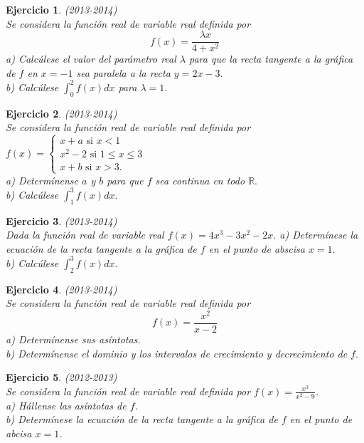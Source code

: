 \documentclass[12pt, a4paper]{amsart}
\newtheorem{ejer}{Ejercicio}
\begin{document}
\begin{ejer}\em (2013-2014)\\
Se considera la función real de variable real definida por
\[f(x)=\frac{\lambda x}{4+x^2}\]
a) Calcúlese el valor del parámetro real $\lambda$ para que la recta tangente a la gráfica de $f$ en $x=-1$ sea paralela a la recta $y=2x-3.$\\
b) Calcúlese $\int_0^2f(x)dx$ para $\lambda=1.$
\end{ejer}

\begin{ejer}\em  (2013-2014)\\
Se considera la función real de variable real definida por $f(x)=\left \{ \begin{matrix}
x+a \text{ si } x<1\\
x^2-2\text{ si } 1\leq x\leq 3\\
x+b \text{ si } x>3.
\end{matrix}\right.
$\\
a) Determínense $a$ y $b$ para que $f$ sea continua en todo $\mathbb{R}.$\\
b) Calcúlese $\int_1^3 f(x)dx.$
\end{ejer}

\begin{ejer}\em (2013-2014)\\
Dada la función real de variable real $f(x)=4x^3-3x^2-2x.$
a) Determínese la ecuación de la recta tangente a la gráfica de $f$ en el punto de abscisa $x=1.$\\
b) Calcúlese $\int_2^3f(x)dx.$
\end{ejer}

\begin{ejer}\em (2013-2014)\\
Se considera la función real de variable real definida por 
\[f(x)=\frac{x^2}{x-2}\]
a) Determínense sus asíntotas.\\
b) Determínense el dominio y los intervalos de crecimiento y decrecimiento de $f.$
\end{ejer}


\begin{ejer}\em (2012-2013)\\
Se considera la función real de variable real definida por $f(x)=\frac{x^3}{x^2-9}$.\\
a) Hállense las asíntotas de $f$.\\
b) Determínese la ecuación de la recta tangente a la gráfica de  $f$ en el punto de abcisa $x=1$.
\end{ejer}
\end{document}
